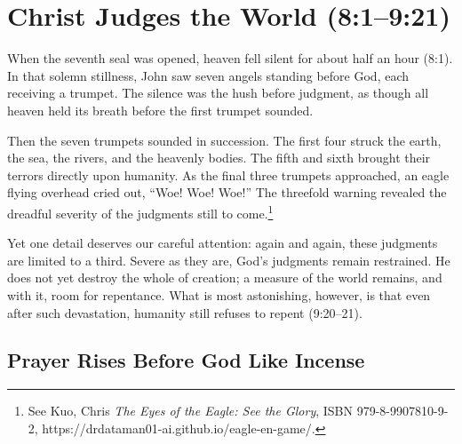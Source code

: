 \chapter{Christ Judges the World (8:1--9:21)}

When the seventh seal was opened, heaven fell silent for about half an hour (8:1). In that solemn stillness, John saw seven angels standing before God, each receiving a trumpet. The silence was the hush before judgment, as though all heaven held its breath before the first trumpet sounded.

Then the seven trumpets sounded in succession. The first four struck the earth, the sea, the rivers, and the heavenly bodies. The fifth and sixth brought their terrors directly upon humanity. As the final three trumpets approached, an eagle flying overhead cried out, “Woe! Woe! Woe!” The threefold warning revealed the dreadful severity of the judgments still to come.\footnote{See Kuo, Chris \textit{The Eyes of the Eagle: See the Glory}, ISBN 979-8-9907810-9-2, https://drdataman01-ai.github.io/eagle-en-game/.}

Yet one detail deserves our careful attention: again and again, these judgments are limited to a third. Severe as they are, God's judgments remain restrained. He does not yet destroy the whole of creation; a measure of the world remains, and with it, room for repentance. What is most astonishing, however, is that even after such devastation, humanity still refuses to repent (9:20--21).

\section{Prayer Rises Before God Like Incense}

